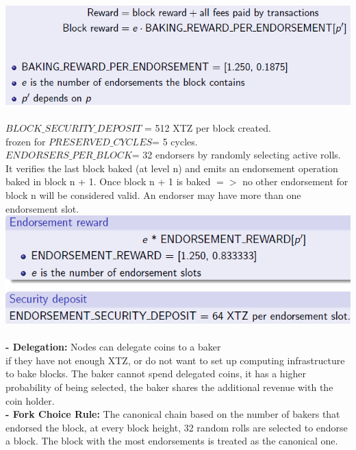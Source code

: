 \documentclass{article}
\begin{document}
\includegraphics[scale=0.7]{47.png}\\\\
\textbf{$BLOCK\_SECURITY\_DEPOSIT$ }= 512 XTZ per block created.\\
frozen for \textbf{$PRESERVED\_CYCLES $}= 5 cycles.\\
\textbf{$ENDORSERS\_PER\_BLOCK $}= 32 endorsers by randomly selecting active rolls.\\
It verifies the last block baked (at level n) and emits an endorsement operation baked in block n + 1. Once block n + 1 is baked $=>$ no other endorsement for block n will be considered valid. An endorser may have more than one endorsement slot.\\
\includegraphics[scale=0.7]{48.png}\\\\
\textbf{- Delegation: }Nodes can delegate coins to a baker\\
if they have not enough XTZ, or do not want to set up computing infrastructure to bake blocks. The baker cannot spend delegated coins, it has a higher probability of being selected, the baker shares the additional revenue with the coin holder.\\
\textbf{- Fork Choice Rule: }The canonical chain based on the number of bakers that endorsed the block, at every block height, 32 random rolls are selected to endorse a block. The block with the most endorsements is treated as the canonical one.\\
\end{document}
